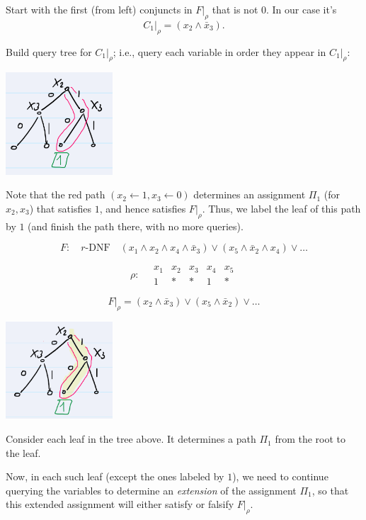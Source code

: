 \noindent
Start with the first (from left) conjuncts in \( F|_{\rho} \) that is not \( 0 \). In our case it's
\[
C_1|_{\rho} = (x_2 \land \bar{x}_3).
\]

\noindent
Build query tree for \( C_1|_{\rho} \); i.e., query each variable in order they appear in \( C_1|_{\rho} \):
 
 
 \includegraphics[width=0.3\textwidth]{images/1st-ex-dt.png}
 
 
\noindent
Note that the red path \((x_2 \gets 1, x_3 \gets 0)\) determines an assignment \( \Pi_1 \) (for \( x_2, x_3 \)) that satisfies \( 1 \), and hence satisfies \( F|_{\rho} \). Thus, we label the leaf of this path by \( 1 \) (and finish the path there, with no more queries).


\[
F: \quad r\text{-DNF} \quad (x_1 \land x_2 \land x_4 \land \bar{x}_3) \lor (x_5 \land \bar{x}_2 \land x_4) \lor \dots
\]

\[
\rho: \quad 
\begin{array}{ccccc}
x_1 & x_2 & x_3 & x_4 & x_5 \\
1 & * & * & 1 & *
\end{array}
\]

\[
F|_{\rho} = (x_2 \land \bar{x}_3) \lor (x_5 \land \bar{x}_2) \lor \dots
\]

\noindent 



\includegraphics[width=0.3\textwidth]{images/ex2-sl-dt.png}

\noindent
Consider each leaf in the tree above. It determines a path \( \Pi_1 \) from the root to the leaf.

\noindent
Now, in each such leaf (except the ones labeled by \( 1 \)), we need to continue querying the variables to determine an \textit{extension} of the assignment \( \Pi_1 \), so that this extended assignment will either satisfy or falsify \( F|_{\rho} \).

